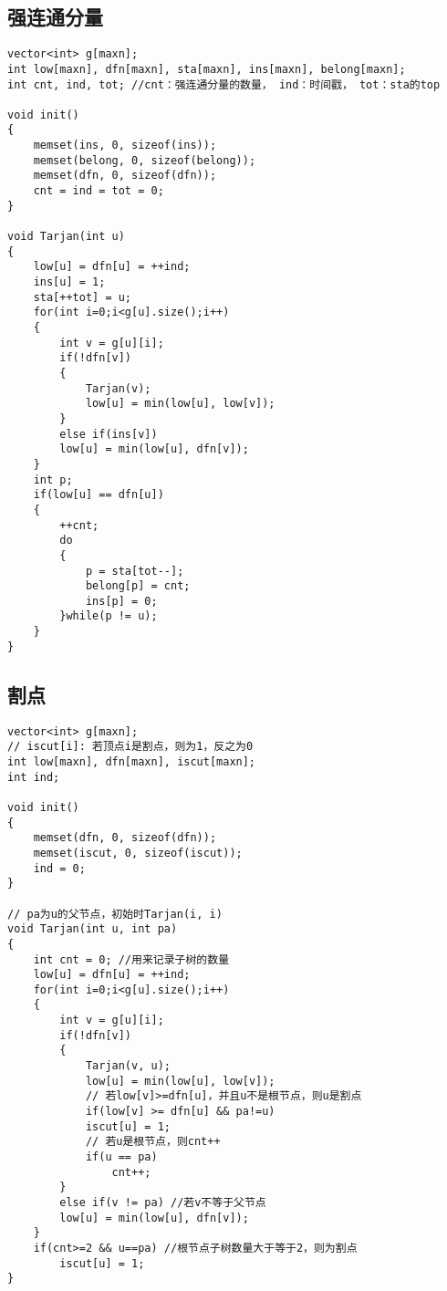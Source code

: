 \subsection{强连通分量}
\begin{lstlisting}
vector<int> g[maxn];
int low[maxn], dfn[maxn], sta[maxn], ins[maxn], belong[maxn];
int cnt, ind, tot; //cnt：强连通分量的数量， ind：时间戳， tot：sta的top

void init()
{
	memset(ins, 0, sizeof(ins));
	memset(belong, 0, sizeof(belong));
	memset(dfn, 0, sizeof(dfn));
	cnt = ind = tot = 0;
}

void Tarjan(int u)
{
	low[u] = dfn[u] = ++ind;
	ins[u] = 1;
	sta[++tot] = u;
	for(int i=0;i<g[u].size();i++)
	{
		int v = g[u][i];
		if(!dfn[v])
		{
			Tarjan(v);
			low[u] = min(low[u], low[v]);
		}
		else if(ins[v])
		low[u] = min(low[u], dfn[v]);
	}
	int p;
	if(low[u] == dfn[u])
	{
		++cnt;
		do
		{
			p = sta[tot--];
			belong[p] = cnt;
			ins[p] = 0;
		}while(p != u);
	}
}
\end{lstlisting}

\subsection{割点}
\begin{lstlisting}
vector<int> g[maxn];
// iscut[i]: 若顶点i是割点，则为1，反之为0
int low[maxn], dfn[maxn], iscut[maxn];
int ind;

void init()
{
	memset(dfn, 0, sizeof(dfn));
	memset(iscut, 0, sizeof(iscut));
	ind = 0;
}

// pa为u的父节点，初始时Tarjan(i, i)
void Tarjan(int u, int pa)
{
	int cnt = 0; //用来记录子树的数量
	low[u] = dfn[u] = ++ind;
	for(int i=0;i<g[u].size();i++)
	{
		int v = g[u][i];
		if(!dfn[v])
		{
			Tarjan(v, u);
			low[u] = min(low[u], low[v]);
			// 若low[v]>=dfn[u]，并且u不是根节点，则u是割点
			if(low[v] >= dfn[u] && pa!=u)
			iscut[u] = 1;
			// 若u是根节点，则cnt++
			if(u == pa)
				cnt++;
		}
		else if(v != pa) //若v不等于父节点
		low[u] = min(low[u], dfn[v]);
	}
	if(cnt>=2 && u==pa) //根节点子树数量大于等于2，则为割点
		iscut[u] = 1;
}
\end{lstlisting}

